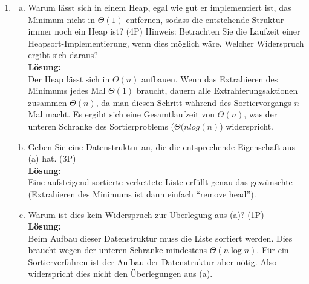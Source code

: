 \documentclass{scrartcl}
\begin{document}
\begin{enumerate}[(1)]
\item \begin{enumerate}[(a)]
	\item Warum l\"asst sich in einem Heap, egal wie gut er implementiert ist, das Minimum nicht in $\Theta(1)$ entfernen, sodass die entstehende Struktur immer noch ein Heap ist? (4P) \newline
Hinweis: Betrachten Sie die Laufzeit einer Heapsort-Implementierung, wenn dies möglich wäre. Welcher Widerspruch ergibt sich daraus?\\
\textbf{Lösung:}\\
Der Heap l\"asst sich in $\Theta(n)$ aufbauen. Wenn das Extrahieren des Minimums jedes Mal $\Theta(1)$ braucht, dauern alle Extrahierungsaktionen zusammen $\Theta(n)$, da man diesen Schritt während des Sortiervorgangs $n$ Mal macht. Es ergibt sich eine Gesamtlaufzeit von $\Theta(n)$, was der unteren Schranke des Sortierproblems ($\Theta(nlog(n)$) widerspricht.

	\item Geben Sie eine Datenstruktur an, die die entsprechende Eigenschaft aus (a) hat. (3P)\\
	\textbf{Lösung:}\\
	Eine aufsteigend sortierte verkettete Liste erf\"ullt genau das gew\"unschte (Extrahieren des Minimums ist dann einfach "`remove head"').


	\item Warum ist dies kein Widerspruch zur \"Uberlegung aus (a)? (1P)\\
	\textbf{Lösung:}\\
	Beim Aufbau dieser Datenstruktur muss die Liste sortiert werden. Dies braucht wegen der unteren Schranke mindestens $\Theta(n\log n)$. F\"ur ein Sortierverfahren ist der Aufbau der Datenstruktur aber n\"otig. Also widerspricht dies nicht den \"Uberlegungen aus (a).

\end{enumerate}
\end{enumerate}
\end{document}
